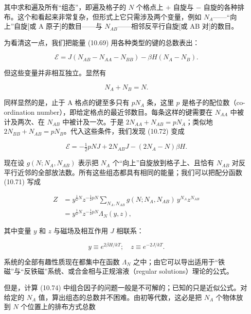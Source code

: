 其中求和遍及所有“组态”，即遍及格子的 $N$ 个格点上 $+$ 自旋与 $-$ 自旋的各种排布。这个和看起来非常复杂，但形式上它只需涉及两个变量，例如 $N_A$——“向上”自旋[或 A 原子]的数目——与 $N_{AB}$——相邻反平行自旋[或 AB 对]的数目。

为看清这一点，我们把能量 (10.69) 用各种类型的键的总数表出：

\begin{equation*}
\mathcal{E} = J(N_{AB} - N_{AA} - N_{BB}) - \beta H (N_A - N_B).
\tag{10.72}
\end{equation*}

但这些变量并非相互独立。显然有

\begin{equation*}
N_A + N_B = N.
\end{equation*}

同样显然的是，止于 A 格点的键至多只有 $pN_A$ 条，这里 $p$ 是格子的配位数（co-ordination number），即给定格点的最近邻数目。每条这样的键需要在 $N_{AA}$ 中被计及两次、在 $N_{AB}$ 中被计及一次。于是 $2N_{AA} + N_{AB} = pN_A$；类似地 $2N_{BB} + N_{AB} = pN_B$。代入这些条件，我们发现 (10.72) 变成

\begin{equation*}
\mathcal{E} = -\tfrac{1}{2} pNJ + 2N_{AB} J - (2N_A - N)\beta H.
\tag{10.73}
\end{equation*}

现在设 $g(N; N_A, N_{AB})$ 表示把 $N_A$ 个“向上”自旋放到格子上、且恰有 $N_{AB}$ 对反平行近邻的全部放法数。所有这些组态都具有相同的能量；我们可以把配分函数 (10.71) 写成

\begin{align*}
Z &= y^{\frac{1}{2}N} z^{-\frac{1}{2}pN} \sum_{N_A, N_{AB}} g(N; N_A, N_{AB})\, y^{N_A} z^{N_{AB}} \\
&= y^{\frac{1}{2}N} z^{-\frac{1}{2}pN} \Lambda_N(y, z),
\tag{10.74}
\end{align*}

其中变量 $y$ 和 $z$ 与磁场及相互作用 $J$ 相联系：

\begin{equation*}
y \equiv e^{2\beta H/kT}; \quad z \equiv e^{-2J/kT}.
\tag{10.75}
\end{equation*}

系统的全部有趣性质现在都集中在函数 $\Lambda_N$ 之中；由它可以导出适用于“铁磁”与“反铁磁”系统、或合金相与正规溶液（regular solutions）理论的公式。

但是，计算 (10.74) 中组合因子的问题一般是不可解的；已知的只是近似公式。对给定的 $N_A$ 值，算出组态的总数并不困难。由初等代数，这必是把 $N_A$ 个物体放到 $N$ 个位置上的排布方式总数

